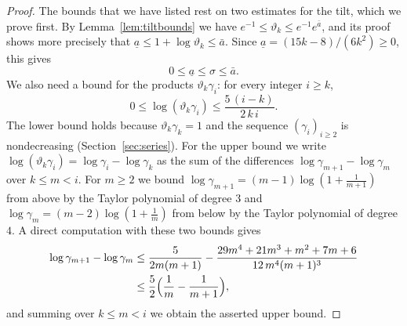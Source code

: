 \documentclass{amsart}
\theoremstyle{definition}
\theoremstyle{remark}
\numberwithin{equation}{section}
\begin{document}
\begin{proof}
The bounds that we have listed rest on two estimates for the tilt, which we prove first. By Lemma~\ref{lem:tiltbounds} we have $e^{-1}\le\vartheta_k\le e^{-1}e^{\bar a}$, and its proof shows more precisely that $\underline a\le 1+\log\vartheta_k\le\bar a$. Since $\underline a=(15k-8)/(6k^2)\ge 0$, this gives
\[
0\le\underline a\le\sigma\le\bar a.
\]
We also need a bound for the products $\vartheta_k\gamma_i$: for every integer $i\ge k$,
\begin{equation}\label{eq:strip-loggamma}
0\le\log(\vartheta_k\gamma_i)\le\frac{5\,(i-k)}{2\,k\,i}.
\end{equation}
The lower bound holds because $\vartheta_k\gamma_k=1$ and the sequence $(\gamma_i)_{i\ge 2}$ is nondecreasing (Section~\ref{sec:series}). For the upper bound we write $\log(\vartheta_k\gamma_i)=\log\gamma_i-\log\gamma_k$ as the sum of the differences $\log\gamma_{m+1}-\log\gamma_m$ over $k\le m<i$. For $m\ge 2$ we bound $\log\gamma_{m+1}=(m-1)\log(1+\frac{1}{m+1})$ from above by the Taylor polynomial of degree $3$ and $\log\gamma_m=(m-2)\log(1+\frac1m)$ from below by the Taylor polynomial of degree $4$. A direct computation with these two bounds gives
\begin{align*}
\log\gamma_{m+1}-\log\gamma_m&\le\frac{5}{2m(m+1)}-\frac{29m^4+21m^3+m^2+7m+6}{12\,m^4(m+1)^3}\\
&\le\frac52\Bigl(\frac1m-\frac1{m+1}\Bigr),
\end{align*}
and summing over $k\le m<i$ we obtain the asserted upper bound.


\end{proof}
\end{document}

